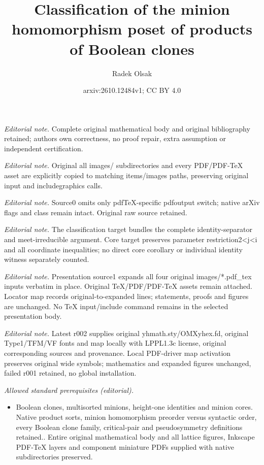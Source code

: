 \documentclass{amsart}
\title{Classification of the minion homomorphism poset of products of Boolean clones}
\author{Radek Olsak}
\date{arxiv:2610.12484v1; CC BY 4.0}
\numberwithin{equation}{section}
\theoremstyle{plain}
\theoremstyle{definition}
\begin{document}
\maketitle
\noindent\textit{Editorial note.} Complete original mathematical body and original bibliography retained; authors own correctness, no proof repair, extra assumption or independent certification.\par\medskip
\noindent\textit{Editorial note.} Original all images/ subdirectories and every PDF/PDF-TeX asset are explicitly copied to matching items/images paths, preserving original input and includegraphics calls.\par\medskip
\noindent\textit{Editorial note.} Source0 omits only pdfTeX-specific pdfoutput switch; native arXiv flags and class remain intact. Original raw source retained.\par\medskip
\noindent\textit{Editorial note.} The classification target bundles the complete identity-separator and meet-irreducible argument. Core target preserves parameter restriction2<j<i and all coordinate inequalities; no direct core corollary or individual identity witness separately counted.\par\medskip
\noindent\textit{Editorial note.} Presentation source1 expands all four original images/*.pdf\_tex inputs verbatim in place. Original TeX/PDF/PDF-TeX assets remain attached. Locator map records original-to-expanded lines; statements, proofs and figures are unchanged. No TeX input/include command remains in the selected presentation body.\par\medskip
\noindent\textit{Editorial note.} Latest r002 supplies original yhmath.sty/OMXyhex.fd, original Type1/TFM/VF fonts and map locally with LPPL1.3c license, original corresponding sources and provenance. Local PDF-driver map activation preserves original wide symbols; mathematics and expanded figures unchanged, failed r001 retained, no global installation.\par\medskip
\noindent\textit{Allowed standard prerequisites (editorial).}\begin{itemize}
\item Boolean clones, multisorted minions, height-one identities and minion cores. Native product sorts, minion homomorphism preorder versus syntactic order, every Boolean clone family, critical-pair and pseudosymmetry definitions retained.. Entire original mathematical body and all lattice figures, Inkscape PDF-TeX layers and component miniature PDFs supplied with native subdirectories preserved.
\end{itemize}\medskip
\end{document}

